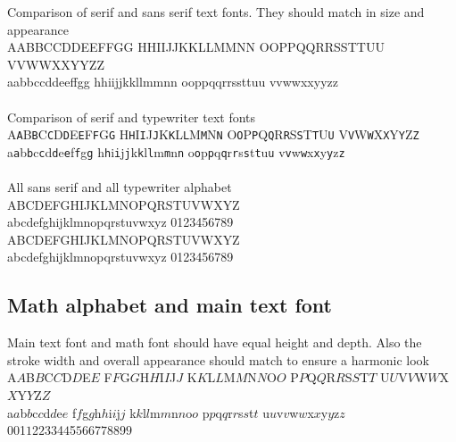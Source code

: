 \documentclass{scrartcl}
\begin{document}
Comparison of serif and sans serif text fonts. They should match in size and
appearance\\
A\textsf{A}B\textsf{B}C\textsf{C}D\textsf{D}E\textsf{E}F\textsf{F}G\textsf{G}
H\textsf{H}I\textsf{I}J\textsf{J}K\textsf{K}L\textsf{L}M\textsf{M}N\textsf{N}
O\textsf{O}P\textsf{P}Q\textsf{Q}R\textsf{R}S\textsf{S}T\textsf{T}U\textsf{U}
V\textsf{V}W\textsf{W}X\textsf{X}Y\textsf{Y}Z\textsf{Z}\\
a\textsf{a}b\textsf{b}c\textsf{c}d\textsf{d}e\textsf{e}f\textsf{f}g\textsf{g}
h\textsf{h}i\textsf{i}j\textsf{j}k\textsf{k}l\textsf{l}m\textsf{m}n\textsf{n}
o\textsf{o}p\textsf{p}q\textsf{q}r\textsf{r}s\textsf{s}t\textsf{t}u\textsf{u}
v\textsf{v}w\textsf{w}x\textsf{x}y\textsf{y}z\textsf{z}\\\\
Comparison of serif and typewriter text fonts\\
A\texttt{A}B\texttt{B}C\texttt{C}D\texttt{D}E\texttt{E}F\texttt{F}G\texttt{G}
H\texttt{H}I\texttt{I}J\texttt{J}K\texttt{K}L\texttt{L}M\texttt{M}N\texttt{N}
O\texttt{O}P\texttt{P}Q\texttt{Q}R\texttt{R}S\texttt{S}T\texttt{T}U\texttt{U}
V\texttt{V}W\texttt{W}X\texttt{X}Y\texttt{Y}Z\texttt{Z}\\
a\texttt{a}b\texttt{b}c\texttt{c}d\texttt{d}e\texttt{e}f\texttt{f}g\texttt{g}
h\texttt{h}i\texttt{i}j\texttt{j}k\texttt{k}l\texttt{l}m\texttt{m}n\texttt{n}
o\texttt{o}p\texttt{p}q\texttt{q}r\texttt{r}s\texttt{s}t\texttt{t}u\texttt{u}
v\texttt{v}w\texttt{w}x\texttt{x}y\texttt{y}z\texttt{z}\\\\
All sans serif and all typewriter alphabet\\
{\sffamily ABCDEFGHIJKLMNOPQRSTUVWXYZ\\ abcdefghijklmnopqrstuvwxyz
0123456789}\\
{\ttfamily ABCDEFGHIJKLMNOPQRSTUVWXYZ\\ abcdefghijklmnopqrstuvwxyz
0123456789}

\subsection{Math alphabet and main text font}

Main text font and math font should have equal height and depth. Also the
stroke width and overall appearance should match to ensure a harmonic look\\
A$A$B$B$C$C$D$D$E$E$ F$F$G$G$H$H$I$I$J$J$ K$K$L$L$M$M$N$N$O$O$
P$P$Q$Q$R$R$S$S$T$T$ U$U$V$V$W$W$X$X$Y$Y$Z$Z$\\
a$a$b$b$c$c$d$d$e$e$ f$f$g$g$h$h$i$i$j$j$ k$k$l$l$m$m$n$n$o$o$
p$p$q$q$r$r$s$s$t$t$ u$u$v$v$w$w$x$x$y$y$z$z$\\
0$0$1$1$2$2$3$3$4$4$5$5$6$6$7$7$8$8$9$9$
\end{document}
